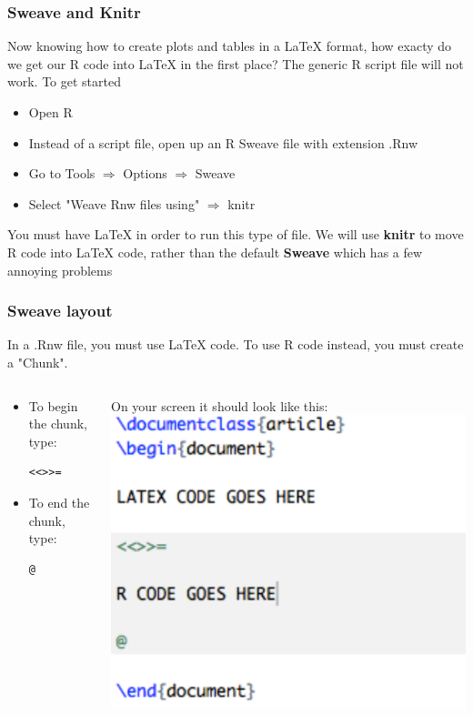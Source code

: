 \documentclass[nogin]{beamer}\usepackage[]{graphicx}\usepackage[]{color}
\begin{document}
\begin{frame}
\frametitle{Sweave and Knitr}
Now knowing how to create plots and tables in a LaTeX format, how exacty do we get our R code into LaTeX in the first place? The generic R script file will not work. To get started
\begin{itemize}
\item Open R
\item Instead of a script file, open up an R Sweave file with extension .Rnw
\item Go to Tools $\Rightarrow$ Options $\Rightarrow$ Sweave
\item Select  "Weave Rnw files using" $\Rightarrow$ knitr
\end{itemize}
You must have LaTeX in order to run this type of file. We will use \textbf{knitr} to move R code into LaTeX code, rather than the default \textbf{Sweave} which has a few annoying problems
\end{frame}

\begin{frame}[fragile]
\frametitle{Sweave layout}
\begin{block}{}
In a .Rnw file, you must use LaTeX code. To use R code instead, you must create a "Chunk".
\end{block}
\begin{columns}[T]
\begin{column}{.5\textwidth}
\begin{itemize}
\item To begin the chunk, type:
\begin{verbatim}<<>>=\end{verbatim}
\item To end the chunk, type:
\begin{verbatim}@\end{verbatim}
\end{itemize}
\end{column}
\begin{column}{.5\textwidth}
On your screen it should look like this:
\includegraphics[width=\textwidth]{GuidePic1.pdf}
\end{column}\end{columns}
\end{frame}
\end{document}
